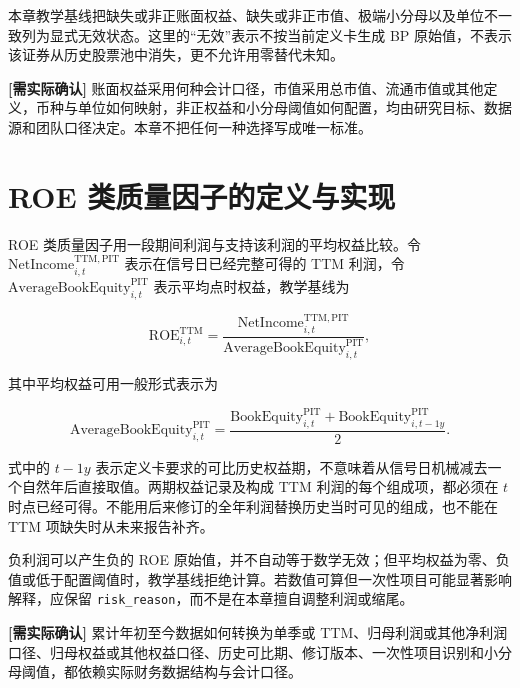 本章教学基线把缺失或非正账面权益、缺失或非正市值、极端小分母以及单位不一致列为显式无效状态。这里的“无效”表示不按当前定义卡生成 BP 原始值，不表示该证券从历史股票池中消失，更不允许用零替代未知。

\begin{confirmbox}
\textbf{[需实际确认]} 账面权益采用何种会计口径，市值采用总市值、流通市值或其他定义，币种与单位如何映射，非正权益和小分母阈值如何配置，均由研究目标、数据源和团队口径决定。本章不把任何一种选择写成唯一标准。
\end{confirmbox}

\section{ROE 类质量因子的定义与实现}

ROE 类质量因子用一段期间利润与支持该利润的平均权益比较。令
\(\mathrm{NetIncome}^{\mathrm{TTM,PIT}}_{i,t}\) 表示在信号日已经完整可得的 TTM 利润，令
\(\mathrm{AverageBookEquity}^{\mathrm{PIT}}_{i,t}\) 表示平均点时权益，教学基线为

\begin{equation}
  \mathrm{ROE}^{\mathrm{TTM}}_{i,t}
  =
  \frac{
    \mathrm{NetIncome}^{\mathrm{TTM,PIT}}_{i,t}
  }{
    \mathrm{AverageBookEquity}^{\mathrm{PIT}}_{i,t}
  } ,
  \label{eq:ch04-roe}
\end{equation}

其中平均权益可用一般形式表示为

\begin{equation}
  \mathrm{AverageBookEquity}^{\mathrm{PIT}}_{i,t}
  =
  \frac{
    \mathrm{BookEquity}^{\mathrm{PIT}}_{i,t}
    +
    \mathrm{BookEquity}^{\mathrm{PIT}}_{i,t-1y}
  }{2}.
  \label{eq:ch04-average-equity}
\end{equation}

式中的 \(t-1y\) 表示定义卡要求的可比历史权益期，不意味着从信号日机械减去一个自然年后直接取值。两期权益记录及构成 TTM 利润的每个组成项，都必须在 \(t\) 时点已经可得。不能用后来修订的全年利润替换历史当时可见的组成，也不能在 TTM 项缺失时从未来报告补齐。

负利润可以产生负的 ROE 原始值，并不自动等于数学无效；但平均权益为零、负值或低于配置阈值时，教学基线拒绝计算。若数值可算但一次性项目可能显著影响解释，应保留 \texttt{risk\_reason}，而不是在本章擅自调整利润或缩尾。

\begin{confirmbox}
\textbf{[需实际确认]} 累计年初至今数据如何转换为单季或 TTM、归母利润或其他净利润口径、归母权益或其他权益口径、历史可比期、修订版本、一次性项目识别和小分母阈值，都依赖实际财务数据结构与会计口径。
\end{confirmbox}


